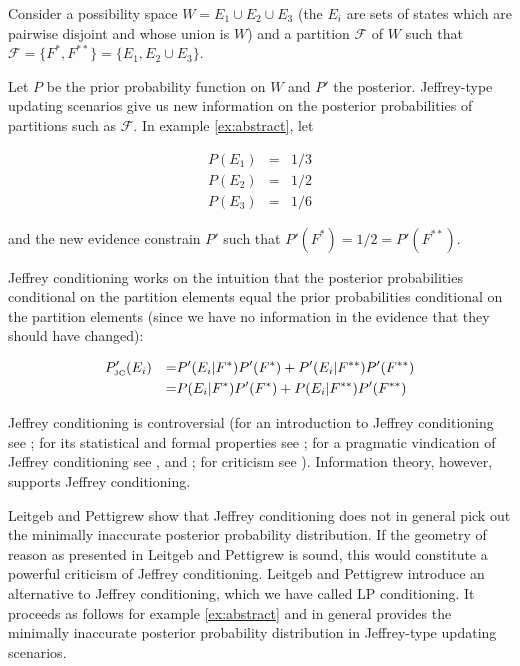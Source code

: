 \documentclass[11pt]{article} \usepackage{october} \onehalfspacing
\begin{document}
\begin{quotex}
  \label{ex:abstract} Consider a possibility
  space $W=E_{1}\cup{}E_{2}\cup{}E_{3}$ (the $E_{i}$ are sets of
  states which are pairwise disjoint and whose union is $W$) and a
  partition $\mathcal{F}$ of $W$ such that
  $\mathcal{F}=\{F^{*},F^{**}\}=\{E_{1},E_{2}\cup{}E_{3}\}$.
\end{quotex}

Let $P$ be the prior probability function on $W$ and $P'$ the
posterior. Jeffrey-type updating scenarios give us new information on
the posterior probabilities of partitions such as $\mathcal{F}$. In
example \ref{ex:abstract}, let

\begin{equation}
  \label{eq:priors}
  \begin{array}{rcl}
    P(E_{1})&=&1/3 \\
    P(E_{2})&=&1/2 \\
    P(E_{3})&=&1/6
  \end{array}
\end{equation}

and the new evidence constrain $P'$ such that
$P'(F^{*})=1/2=P'(F^{**})$.

Jeffrey conditioning works on the intuition that the posterior
probabilities conditional on the partition elements equal the prior
probabilities conditional on the partition elements (since we have no
information in the evidence that they should have changed):

\begin{align}
  \label{eq:jc}
  &P'_{\mbox{\tiny JC}}(E_{i})&=&P'(E_{i}|F^{*})P'(F^{*})+P'(E_{i}|F^{**})P'(F^{**})\notag \\
  &&=&P(E_{i}|F^{*})P'(F^{*})+P(E_{i}|F^{**})P'(F^{**})
\end{align}

Jeffrey conditioning is controversial (for an introduction to Jeffrey
conditioning see ; for its statistical and
formal properties see ; for a pragmatic
vindication of Jeffrey conditioning see , and
; for criticism see
). Information theory, however, supports
Jeffrey conditioning.

Leitgeb and Pettigrew show that Jeffrey conditioning does not in
general pick out the minimally inaccurate posterior probability
distribution. If the geometry of reason as presented in Leitgeb and
Pettigrew is sound, this would constitute a powerful criticism of
Jeffrey conditioning. Leitgeb and Pettigrew introduce an alternative
to Jeffrey conditioning, which we have called LP conditioning. It
proceeds as follows for example \ref{ex:abstract} and in general
provides the minimally inaccurate posterior probability distribution
in Jeffrey-type updating scenarios.
\end{document}
